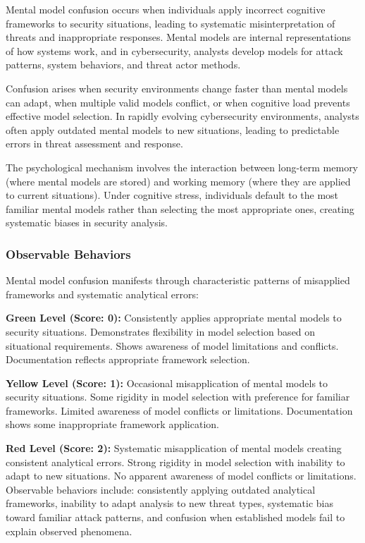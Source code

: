 \documentclass[11pt,a4paper]{article}
\begin{document}
Mental model confusion occurs when individuals apply incorrect cognitive frameworks to security situations, leading to systematic misinterpretation of threats and inappropriate responses\cite{johnson-laird1983}. Mental models are internal representations of how systems work, and in cybersecurity, analysts develop models for attack patterns, system behaviors, and threat actor methods.

Confusion arises when security environments change faster than mental models can adapt, when multiple valid models conflict, or when cognitive load prevents effective model selection\cite{rouse1986}. In rapidly evolving cybersecurity environments, analysts often apply outdated mental models to new situations, leading to predictable errors in threat assessment and response.

The psychological mechanism involves the interaction between long-term memory (where mental models are stored) and working memory (where they are applied to current situations)\cite{baddeley2000}. Under cognitive stress, individuals default to the most familiar mental models rather than selecting the most appropriate ones, creating systematic biases in security analysis.

\subsubsection{Observable Behaviors}

Mental model confusion manifests through characteristic patterns of misapplied frameworks and systematic analytical errors:

\textbf{Green Level (Score: 0):} Consistently applies appropriate mental models to security situations. Demonstrates flexibility in model selection based on situational requirements. Shows awareness of model limitations and conflicts. Documentation reflects appropriate framework selection.

\textbf{Yellow Level (Score: 1):} Occasional misapplication of mental models to security situations. Some rigidity in model selection with preference for familiar frameworks. Limited awareness of model conflicts or limitations. Documentation shows some inappropriate framework application.

\textbf{Red Level (Score: 2):} Systematic misapplication of mental models creating consistent analytical errors. Strong rigidity in model selection with inability to adapt to new situations. No apparent awareness of model conflicts or limitations. Observable behaviors include: consistently applying outdated analytical frameworks, inability to adapt analysis to new threat types, systematic bias toward familiar attack patterns, and confusion when established models fail to explain observed phenomena.
\end{document}
